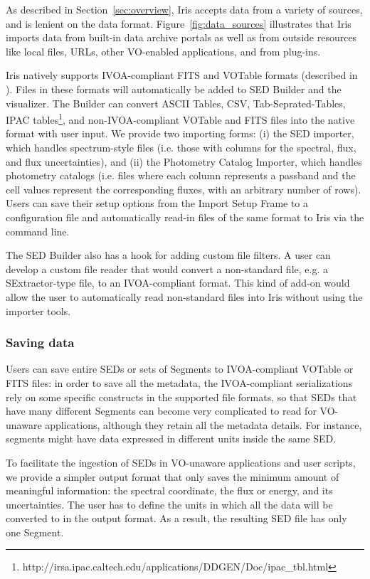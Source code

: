 \documentclass[5p]{elsarticle}
\begin{document}
As described in Section~\ref{sec:overview}, Iris accepts data from a variety of sources, and is lenient on the data format. Figure~\ref{fig:data_sources} illustrates that Iris imports data from built-in data archive portals as well as from outside resources like local files, URLs, other VO-enabled applications, and from plug-ins.

Iris natively supports IVOA-compliant FITS and VOTable formats (described in \cite{2012arXiv1204.3055M}). Files in these formats will automatically be added to SED Builder and the visualizer. The Builder can convert ASCII Tables, CSV, Tab-Seprated-Tables, IPAC tables\footnote{http://irsa.ipac.caltech.edu/applications/DDGEN/Doc/ipac\_tbl.html}, and non-IVOA-compliant VOTable and FITS files into the native format with user input. We provide two importing forms: (i) the SED importer, which handles spectrum-style files (i.e. those with columns for the spectral, flux, and flux uncertainties), and (ii) the Photometry Catalog Importer, which handles photometry catalogs (i.e. files where each column represents a passband and the cell values represent the corresponding fluxes, with an arbitrary number of rows). Users can save their setup options from the Import Setup Frame to a configuration file and automatically read-in files of the same format to Iris via the command line.

The SED Builder also has a hook for adding custom file filters. A user can develop a custom file reader that would convert a non-standard file, e.g. a SExtractor-type file, to an IVOA-compliant format. This kind of add-on would allow the user to automatically read non-standard files into Iris without using the importer tools.

\subsubsection{Saving data}
Users can save entire SEDs or sets of Segments to IVOA-compliant VOTable or FITS files: in order to save all the metadata, the IVOA-compliant serializations rely on some specific constructs in the supported file formats, so that SEDs that have many different Segments can become very complicated to read for VO-unaware applications, although they retain all the metadata details. For instance, segments might have data expressed in different units inside the same SED.

To facilitate the ingestion of SEDs in VO-unaware applications and user scripts, we provide a simpler output format that only saves the minimum amount of meaningful information: the spectral coordinate, the flux or energy, and its uncertainties. The user has to define the units in which all the data will be converted to in the output format. As a result, the resulting SED file has only one Segment.
\end{document}
